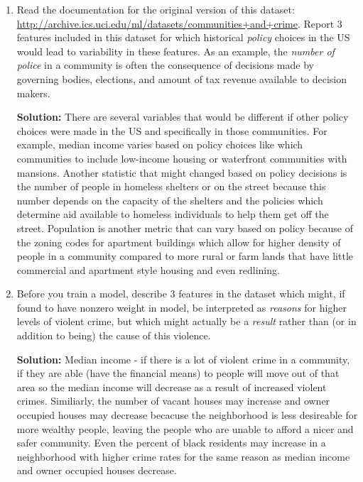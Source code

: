 \documentclass[shortlabels]{article}
\begin{document}
\begin{aprob}

    \begin{enumerate}
        \item {} Read the documentation for the original version of this dataset: \url{http://archive.ics.uci.edu/ml/datasets/communities+and+crime}. Report 3 features included in this dataset for which historical \emph{policy} choices in the US would lead to variability in these features. As an example, the \emph{number of police} in a community is often the consequence of decisions made by governing bodies, elections, and amount of tax revenue available to decision makers.
        
        \textbf{Solution:}
        There are several variables that would be different if other policy choices were made in the US and specifically in those communities. For example, median income varies based on policy choices like which communities to include low-income housing or waterfront communities with mansions. 
        Another statistic that might changed based on policy decisions is the number of people in homeless shelters or on the street because this number depends on the capacity of the shelters and the policies which determine aid available to homeless individuals to help them get off the street. 
        Population is another metric that can vary based on policy because of the zoning codes for apartment buildings which allow for higher density of people in a community compared to more rural or farm lands that have little commercial and apartment style housing and even redlining.

        \newpage
        \item {} Before you train a model, describe 3 features in the dataset which might, if found to have nonzero weight in model, be interpreted as \emph{reasons} for higher levels of violent crime, but which might actually be a \emph{result} rather than (or in addition to being) the cause of this violence.
    
        \textbf{Solution:}
        Median income - if there is a lot of violent crime in a community, if they are able (have the financial means) to people will move out of that area so the median income will decrease as a result of increased violent crimes. 
        Similiarly, the number of vacant houses may increase and owner occupied houses may decrease becacuse the neighborhood is less desireable for more wealthy people, leaving the people who are unable to afford a nicer and safer community. 
        Even the percent of black residents may increase in a neighborhood with higher crime rates for the same reason as median income and owner occupied houses decrease. 
    \end{enumerate}


\end{aprob}
\end{document}
